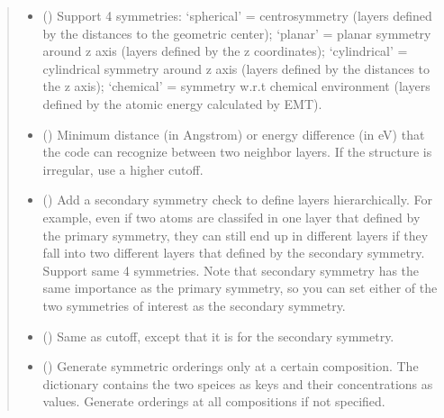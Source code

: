 \documentclass[letterpaper,10pt,english]{sphinxmanual}
\begin{document}
\begin{fulllineitems}
\begin{quote}
\begin{description}
\begin{itemize}
\item {} 
 (\sphinxstyleliteralemphasis{\sphinxupquote{, }}) \textendash{} Support 4 symmetries:
‘spherical’ = centrosymmetry (layers defined by the distances
to the geometric center);
‘planar’ = planar symmetry around z axis (layers defined by
the z coordinates);
‘cylindrical’ = cylindrical symmetry around z axis (layers
defined by the distances to the z axis);
‘chemical’ = symmetry w.r.t chemical environment (layers
defined by the atomic energy calculated by EMT).

\item {} 
 (\sphinxstyleliteralemphasis{\sphinxupquote{, }}) \textendash{} Minimum distance (in Angstrom) or energy difference (in eV)
that the code can recognize between two neighbor layers.
If the structure is irregular, use a higher cutoff.

\item {} 
 (\sphinxstyleliteralemphasis{\sphinxupquote{, }}) \textendash{} Add a secondary symmetry check to define layers hierarchically.
For example, even if two atoms are classifed in one layer that
defined by the primary symmetry, they can still end up in
different layers if they fall into two different layers that
defined by the secondary symmetry. Support same 4 symmetries.
Note that secondary symmetry has the same importance as the
primary symmetry, so you can set either of the two symmetries
of interest as the secondary symmetry.

\item {} 
 (\sphinxstyleliteralemphasis{\sphinxupquote{, }}) \textendash{} Same as cutoff, except that it is for the secondary symmetry.

\item {} 
 (\sphinxstyleliteralemphasis{\sphinxupquote{, }}) \textendash{} Generate symmetric orderings only at a certain composition.
The dictionary contains the two speices as keys and their
concentrations as values. Generate orderings at all
compositions if not specified.


\end{itemize}
\end{description}
\end{quote}
\end{fulllineitems}
\end{document}
